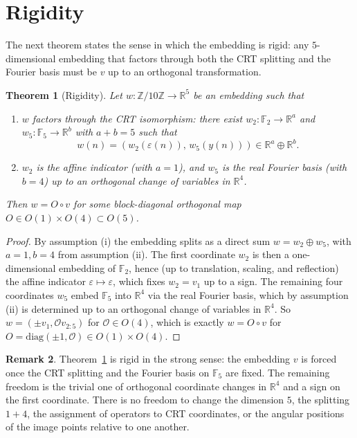 \documentclass[11pt,reqno]{amsart}
\newtheorem{theorem}{Theorem}[section]
\theoremstyle{definition}
\newtheorem{remark}[theorem]{Remark}
\newcommand{\Z}{\mathbb{Z}}
\newcommand{\R}{\mathbb{R}}
\newcommand{\F}{\mathbb{F}}
\begin{document}
\section{Rigidity}
\label{sec:rigidity}

The next theorem states the sense in which the embedding is rigid:
any $5$-dimensional embedding that factors through both the CRT
splitting and the Fourier basis must be $v$ up to an orthogonal
transformation.

\begin{theorem}[Rigidity]
\label{thm:rigidity}
Let $w: \Z/10\Z \to \R^5$ be an embedding such that
\begin{enumerate}[label=\textup{(\roman*)},leftmargin=*]
\item $w$ factors through the CRT isomorphism: there exist
  $w_2: \F_2 \to \R^a$ and $w_5: \F_5 \to \R^b$ with $a + b = 5$
  such that
  \[ w(n) = (w_2(\varepsilon(n)),\, w_5(y(n))) \in \R^a \oplus \R^b. \]
\item $w_2$ is the affine indicator (with $a = 1$), and $w_5$ is
  the real Fourier basis (with $b = 4$) up to an orthogonal change
  of variables in $\R^4$.
\end{enumerate}
Then $w = O \circ v$ for some block-diagonal orthogonal map
$O \in O(1) \times O(4) \subset O(5)$.
\end{theorem}

\begin{proof}
By assumption (i) the embedding splits as a direct sum
$w = w_2 \oplus w_5$, with $a = 1, b = 4$ from assumption (ii).
The first coordinate $w_2$ is then a one-dimensional embedding of
$\F_2$, hence (up to translation, scaling, and reflection) the
affine indicator $\varepsilon \mapsto \varepsilon$, which fixes
$w_2 = v_1$ up to a sign. The remaining four coordinates $w_5$
embed $\F_5$ into $\R^4$ via the real Fourier basis, which by
assumption (ii) is determined up to an orthogonal change of
variables in $\R^4$. So $w = (\pm v_1, \mathcal{O} v_{2:5})$ for
$\mathcal{O} \in O(4)$, which is exactly $w = O \circ v$ for
$O = \mathrm{diag}(\pm 1, \mathcal{O}) \in O(1) \times O(4)$.
\end{proof}

\begin{remark}
\label{rem:rigidity-strength}
Theorem~\ref{thm:rigidity} is rigid in the strong sense: the
embedding $v$ is forced once the CRT splitting and the Fourier
basis on $\F_5$ are fixed. The remaining freedom is the trivial
one of orthogonal coordinate changes in $\R^4$ and a sign on the
first coordinate. There is no freedom to change the dimension
$5$, the splitting $1+4$, the assignment of operators to CRT
coordinates, or the angular positions of the image points
relative to one another.
\end{remark}
\end{document}
